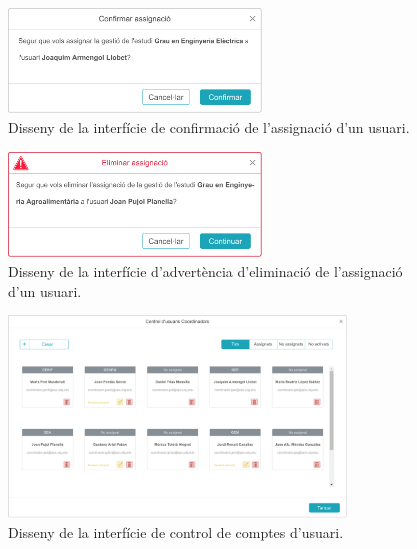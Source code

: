 \documentclass[a4paper,12pt]{ThesisStyle}
\begin{document}
\begin{figure}[H]
	\centering
	\includegraphics[width=0.6\textwidth]{assets/interfaces/administradors/gestCoords/confirmarBox.pdf}
	\caption{\label{img:gestCoords_confirmarBox}Disseny de la interfície de confirmació de l'assignació d'un usuari.}
\end{figure}

\begin{figure}[H]
	\centering
	\includegraphics[width=0.6\textwidth]{assets/interfaces/administradors/gestCoords/confirmarEsborrarBox.pdf}
	\caption{\label{img:gestCoords_confirmarEsborrarBox}Disseny de la interfície d'advertència d'eliminació de l'assignació d'un usuari.}
\end{figure}

\begin{figure}[H]
	\centering
	\includegraphics[width=0.8\textwidth]{assets/interfaces/administradors/gestCoords/gestUsuarisDialog.pdf}
	\caption{\label{img:gestCoords_gestUsuarisDialog}Disseny de la interfície de control de comptes d'usuari.}
\end{figure}
\end{document}
